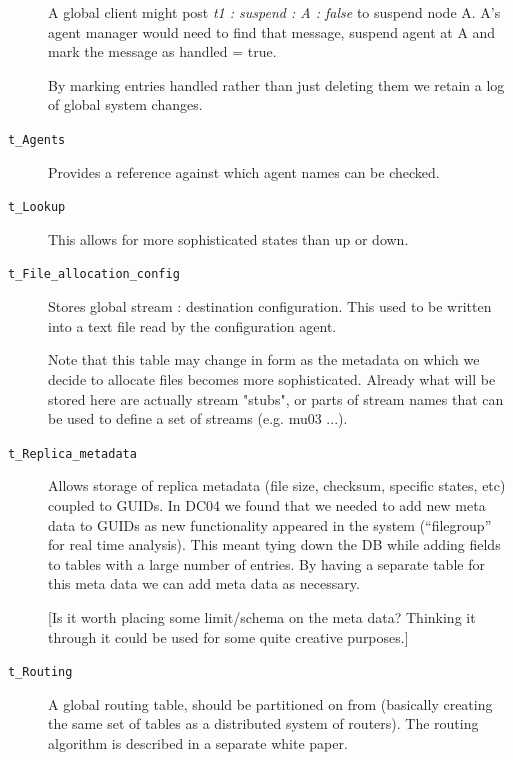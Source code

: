 \documentclass{cmspaper}
\begin{document}
\begin{description}
    A global client might post {\em t1 : suspend : A : false} to suspend
    node A.  A's agent manager would need to find that message, suspend
    agent at A and mark the message as handled = true.

    By marking entries handled rather than just deleting them we
    retain a log of global system changes.

  \item [\texttt{t\_Agents}]\mbox{}

    Provides a reference against which agent names can be checked.

  \item [\texttt{t\_Lookup}]\mbox{}

    This allows for more sophisticated states than up or down.

  \item [\texttt{t\_File\_allocation\_config}]\mbox{}

    Stores global stream : destination configuration.  This used to be
    written into a text file read by the configuration agent.
    
    Note that this table may change in form as the metadata on which we
    decide to allocate files becomes more sophisticated. Already what will
    be stored here are actually stream "stubs", or parts of stream names
    that can be used to define a set of streams (e.g. mu03 ...).

  \item [\texttt{t\_Replica\_metadata}]\mbox{}

    Allows storage of replica metadata (file size, checksum, specific
    states, etc) coupled to GUIDs.  In DC04 we found that we needed to
    add new meta data to GUIDs as new functionality appeared in the
    system (``filegroup'' for real time analysis).  This meant tying
    down the DB while adding fields to tables with a large number of
    entries.  By having a separate table for this meta data we can add
    meta data as necessary.

    [Is it worth placing some limit/schema on the meta data?  Thinking
    it through it could be used for some quite creative purposes.]

  \item [\texttt{t\_Routing}]\mbox{}

    A global routing table, should be partitioned on from (basically
    creating the same set of tables as a distributed system of
    routers).  The routing algorithm is described in a separate white paper.
\end{description}
\end{document}

